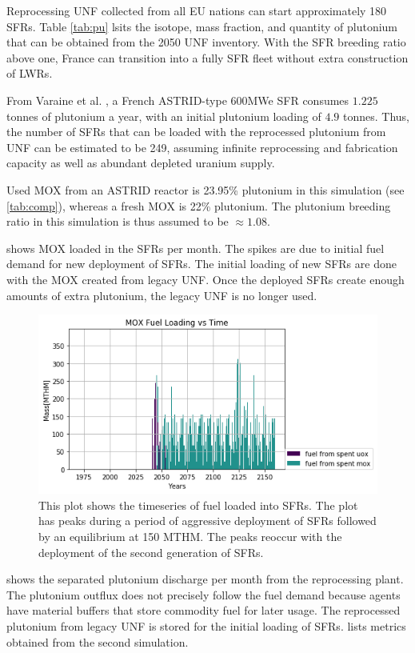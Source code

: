 Reprocessing \gls{UNF} collected from all EU nations can start approximately
180 \glspl{SFR}. Table \ref{tab:pu} lsits the isotope, mass fraction,
and quantity of plutonium that can be obtained from the 2050 \gls{UNF} inventory.
 With the \gls{SFR} breeding ratio above one, France can transition into
a fully \gls{SFR} fleet without extra construction of \glspl{LWR}. 

From Varaine et al. \cite{varaine_pre-conceptual_2012}, a French
ASTRID-type 600\gls{MWe} \gls{SFR} consumes $1.225$ tonnes of
plutonium a year, with an initial plutonium loading of $4.9$ tonnes. 
Thus, the number of \glspl{SFR} that can be loaded with the reprocessed
plutonium from \gls{UNF} can be estimated to be 249, assuming infinite 
reprocessing and fabrication capacity as well as abundant depleted uranium 
supply.
 
Used \gls{MOX} from an ASTRID reactor is 23.95\% plutonium
in this simulation (see \cref{tab:comp}), whereas a fresh \gls{MOX} is 22\% plutonium.
The plutonium breeding ratio in this simulation is thus assumed to be
$\approx 1.08$.

 shows \gls{MOX} loaded in the \glspl{SFR} per month.
The spikes are due to initial fuel demand for new deployment of \glspl{SFR}.
The initial loading of new \glspl{SFR} are done with the \gls{MOX} created
from legacy \gls{UNF}. Once the deployed \glspl{SFR} create enough amounts
 of extra plutonium, the legacy \gls{UNF} is no longer used. 

\begin{figure}[htbp!]
	\begin{center}
		\includegraphics[scale=0.7]{./images/french-transition/where_fuel.png}
	\end{center}
	\caption{This plot shows the timeseries of fuel loaded into \glspl{SFR}.
			 The plot has peaks during a period of aggressive deployment of \glspl{SFR}
			 followed by an equilibrium at 150 \gls{MTHM}. The peaks reoccur with the
			 deployment of the second generation of \glspl{SFR}.}
	\label{fig:fuel}
\end{figure}
  shows the separated plutonium discharge
per month from the reprocessing plant. The plutonium outflux
does not precisely follow the fuel demand because \Cyclus agents have
material buffers that store commodity fuel for later usage. The reprocessed
plutonium from legacy \gls{UNF} is stored for the initial loading of \glspl{SFR}.
 lists metrics obtained from the second simulation.

